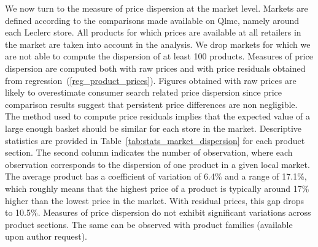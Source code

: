\documentclass[english]{article}
\begin{document}
We now turn to the measure of price dispersion at the market level. Markets are defined according to the comparisons made available on Qlmc, namely around each Leclerc store. All products for which prices are available at all retailers in the market are taken into account in the analysis. We drop markets for which we are not able to compute the dispersion of at least 100 products. Measures of price dispersion are computed both with raw prices and with price residuals obtained from regression~(\ref{reg_product_prices}). Figures obtained with raw prices are likely to overestimate consumer search related price dispersion since price comparison results suggest that persistent price differences are non negligible. The method used to compute price residuals implies that the expected value of a large enough basket should be similar for each store in the market. Descriptive statistics are provided in Table~\ref{tab:stats_market_dispersion} for each product section. The second column indicates the number of observation, where each observation corresponds to the dispersion of one product in a given local market. The average product has a coefficient of variation of 6.4\% and a range of 17.1\%, which roughly means that the highest price of a product is typically around 17\% higher than the lowest price in the market. With residual prices, this gap drops to 10.5\%. Measures of price dispersion do not exhibit significant variations across product sections. The same can be observed with product families (available upon author request).
\end{document}
